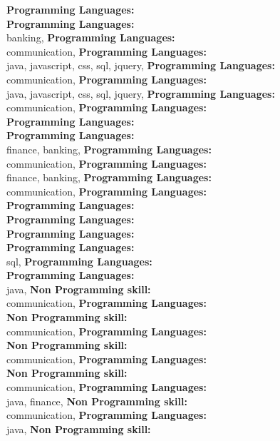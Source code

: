 \textbf{Programming Languages:} \\
\textbf{Programming Languages:} \\
banking, \textbf{Programming Languages:} \\
communication, \textbf{Programming Languages:} \\
java, javascript, css, sql, jquery, \textbf{Programming Languages:} \\
communication, \textbf{Programming Languages:} \\
java, javascript, css, sql, jquery, \textbf{Programming Languages:} \\
communication, \textbf{Programming Languages:} \\
\textbf{Programming Languages:} \\
\textbf{Programming Languages:} \\
finance, banking, \textbf{Programming Languages:} \\
communication, \textbf{Programming Languages:} \\
finance, banking, \textbf{Programming Languages:} \\
communication, \textbf{Programming Languages:} \\
\textbf{Programming Languages:} \\
\textbf{Programming Languages:} \\
\textbf{Programming Languages:} \\
\textbf{Programming Languages:} \\
sql, \textbf{Programming Languages:} \\
\textbf{Programming Languages:} \\
java, \textbf{Non Programming skill:} \\
communication, \textbf{Programming Languages:} \\
\textbf{Non Programming skill:} \\
communication, \textbf{Programming Languages:} \\
\textbf{Non Programming skill:} \\
communication, \textbf{Programming Languages:} \\
\textbf{Non Programming skill:} \\
communication, \textbf{Programming Languages:} \\
java, finance, \textbf{Non Programming skill:} \\
communication, \textbf{Programming Languages:} \\
java, \textbf{Non Programming skill:} \\
